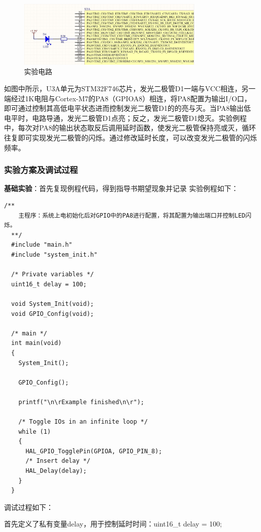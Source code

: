 ﻿\documentclass[UTF8,12pt]{article}
\begin{document}
\begin{enumerate}
    \begin{figure}[htbp]
        \centering
        \includegraphics[width=0.8\textwidth]{imgs/1.jpg}
        \caption{实验电路}
    \end{figure}

    如图中所示，U3A单元为STM32F746芯片，发光二极管D1一端与VCC相连，另一端经过1K电阻与Cortex-M7的PA8（GPIOA8）相连，将PA8配置为输出I/O口，即可通过控制其高低电平状态进而控制发光二极管D1的的亮与灭。当PA8输出低电平时，电路导通，发光二极管D1点亮；反之，发光二极管D1熄灭。实验例程中，每次对PA8的输出状态取反后调用延时函数，使发光二极管保持亮或灭，循环往复即可实现发光二极管的闪烁。通过修改延时长度，可以改变发光二极管的闪烁频率。

\end{enumerate}

\subsubsection{实验方案及调试过程}
\noindent
\textbf{基础实验}：首先复现例程代码，得到指导书期望现象并记录
\noindent
实验例程如下：

\begin{lstlisting}[frame=shadowbox]
    /**
    主程序：系统上电初始化后对GPIO中的PA8进行配置，将其配置为输出端口并控制LED闪烁。
  **/
  #include "main.h"
  #include "system_init.h"
  
  /* Private variables */
  uint16_t delay = 100;
  
  void System_Init(void);
  void GPIO_Config(void);
  
  /* main */
  int main(void)
  {
    System_Init();
    
    GPIO_Config();
    
    printf("\n\rExample finished\n\r");
      
    /* Toggle IOs in an infinite loop */
    while (1)
    {
      HAL_GPIO_TogglePin(GPIOA, GPIO_PIN_8);
      /* Insert delay */
      HAL_Delay(delay);
    }
  }  
\end{lstlisting}
调试过程如下：

首先定义了私有变量delay，用于控制延时时间：uint16\_t delay = 100;
\end{document}
